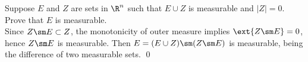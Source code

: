 \begin{hwsol}
Suppose $E$ and $Z$ are sets in $\R^n$ such that $E \cup Z$ is measurable and $|Z|=0$. Prove that $E$ is measurable. \\

\pf Since $Z \sm E \subset Z$, the monotonicity of outer measure implies $\ext{Z \sm E}=0$, hence $Z \sm E$ is measurable. Then $E = (E \cup Z) \sm (Z \sm E)$  is measurable, being the difference of two measurable sets. \qed \\

 \\
\end{hwsol}


